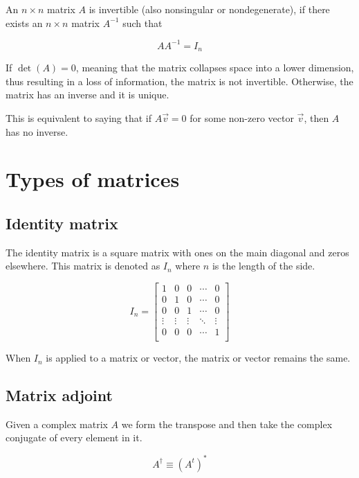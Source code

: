 \documentclass[a4paper]{article}
\begin{document}
An \(n \times n\) matrix \(A\) is invertible (also nonsingular or nondegenerate),
if there exists an \(n \times n\) matrix \(A^{-1}\) such that

\[
    AA^{-1}=I_n
\]

If \(\det(A) = 0\), meaning that the matrix collapses space into a lower dimension,
thus resulting in a loss of information, the matrix is not invertible.
Otherwise, the matrix has an inverse and it is unique.

This is equivalent to saying that if \(A\vec{v}=0\) for some non-zero vector \(\vec{v}\),
then \(A\) has no inverse.

\pagebreak

\section{Types of matrices}

\subsection{Identity matrix}

The identity matrix is a square matrix with ones on the main diagonal and zeros elsewhere.
This matrix is denoted as \(I_n\) where \(n\) is the length of the side.

\[
    I_n=
    \begin{bmatrix}
        1 & 0 & 0 & \cdots & 0 \\
        0 & 1 & 0 & \cdots & 0 \\
        0 & 0 & 1 & \cdots & 0 \\
        \vdots & \vdots & \vdots & \ddots & \vdots \\
        0 & 0 & 0 & \cdots & 1 \\
    \end{bmatrix}
\]

When \(I_n\) is applied to a matrix or vector, the matrix or vector remains the same.


\subsection{Matrix adjoint}

Given a complex matrix \(A\) we form the transpose and then take the complex conjugate of every element in it.

\[
    A^\dagger \equiv {\left(A^t\right)}^{*}
\]
\end{document}
